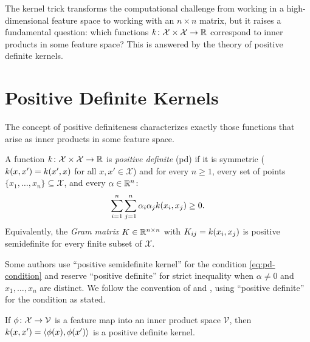 \documentclass[11pt,a4paper]{article}
\begin{document}
The kernel trick transforms the computational challenge from working
in a high-dimensional feature space to working with an $n \times n$
matrix, but it raises a fundamental question: which functions
$k \colon \mathcal{X} \times \mathcal{X} \to \mathbb{R}$ correspond to
inner products in some feature space? This is answered by the theory
of positive definite kernels.


\section{Positive Definite Kernels}
\label{sec:pd-kernels}

The concept of positive definiteness characterizes exactly those
functions that arise as inner products in some feature space.

\begin{definition}
\label{def:pd-kernel}
A function $k \colon \mathcal{X} \times \mathcal{X} \to \mathbb{R}$
is \emph{positive definite} (pd) if it is symmetric
($k(x, x') = k(x', x)$ for all $x, x' \in \mathcal{X}$)
and for every $n \ge 1$, every set of points $\{x_1, \ldots, x_n\}
\subseteq \mathcal{X}$, and every $\alpha \in \mathbb{R}^n$:
\begin{equation}
\label{eq:pd-condition}
\sum_{i=1}^n \sum_{j=1}^n \alpha_i \alpha_j k(x_i, x_j) \ge 0.
\end{equation}
Equivalently, the \emph{Gram matrix} $K \in \mathbb{R}^{n \times n}$ with
$K_{ij} = k(x_i, x_j)$ is positive semidefinite for every
finite subset of $\mathcal{X}$.
\end{definition}

\begin{remark}
\label{rem:pd-terminology}
Some authors use ``positive semidefinite kernel'' for the condition
\eqref{eq:pd-condition} and reserve ``positive definite'' for strict
inequality when $\alpha \ne 0$ and $x_1, \ldots, x_n$ are distinct.
We follow the convention of \citet{bach2024} and \citet{scholkopf2002},
using ``positive definite'' for the condition as stated.
\end{remark}

\begin{theorem}
\label{thm:ip-kernel-pd}
If $\phi \colon \mathcal{X} \to \mathcal{V}$ is a feature map
into an inner product space $\mathcal{V}$, then
$k(x, x') = \langle \phi(x), \phi(x') \rangle$
is a positive definite kernel.
\end{theorem}
\end{document}

